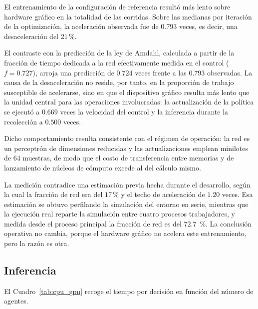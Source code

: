 El entrenamiento de la configuración de referencia resultó más lento
sobre hardware gráfico en la totalidad de las corridas. Sobre las medianas por
iteración de la optimización, la aceleración observada fue de $0{.}793$ veces,
es decir, una desaceleración del $21$\,\%.

El contraste con la predicción de la ley de Amdahl, calculada a partir de la
fracción de tiempo dedicada a la red efectivamente medida en el control
($f = 0{.}727$), arroja una predicción de $0{.}724$ veces frente a las
$0{.}793$ observadas. La causa de la desaceleración no reside, por tanto, en la
proporción de trabajo susceptible de acelerarse, sino en que el dispositivo
gráfico resulta más lento que la unidad central para las operaciones
involucradas: la actualización de la política se ejecutó a $0{.}669$ veces la
velocidad del control y la inferencia durante la recolección a $0{.}500$ veces.

Dicho comportamiento resulta consistente con el régimen de operación: la red es
un perceptrón de dimensiones reducidas y las actualizaciones emplean
minilotes de 64 muestras, de modo que el costo de transferencia entre memorias
y de lanzamiento de núcleos de cómputo excede al del cálculo mismo.

La medición contradice una estimación previa hecha durante el desarrollo, según la cual la fracción de red era del $17$\,\% y el techo de aceleración de $1{.}20$ veces. Esa estimación se obtuvo perfilando la simulación del entorno en serie, mientras que la ejecución real reparte la simulación entre cuatro procesos trabajadores, y medida desde el proceso principal la fracción de red es del $72{.}7$~\%. La conclusión operativa no cambia, porque el hardware gráfico no acelera este entrenamiento, pero la razón es otra.

\subsection*{Inferencia}

El Cuadro~\ref{tab:cpu_gpu} recoge el tiempo por decisión en función del número
de agentes.

